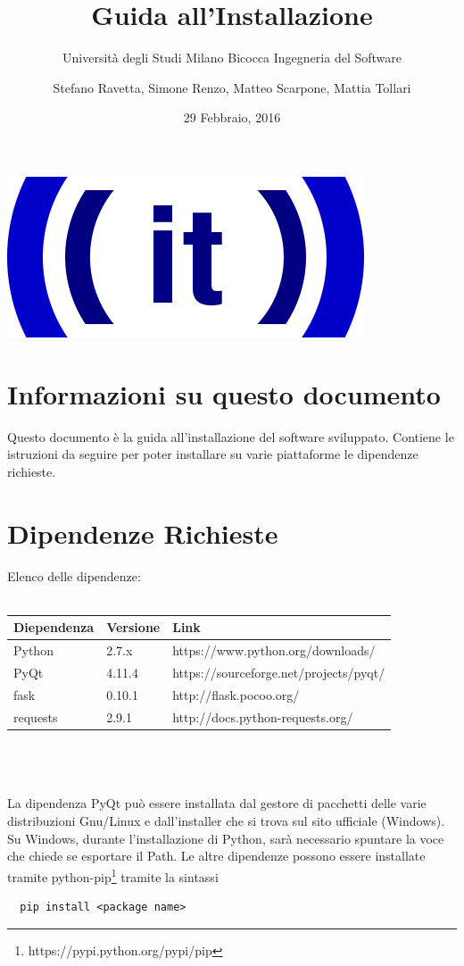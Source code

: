 \documentclass[12pt]{scrartcl}
\title{Guida all'Installazione}
\subtitle{Universit\`a degli Studi Milano Bicocca Ingegneria del Software}
\author{Stefano Ravetta, Simone Renzo, Matteo Scarpone, Mattia Tollari}
\date{29 Febbraio, 2016}
\begin{document}
\maketitle
\centerline{\includegraphics[scale=0.5]{ITicon.png}}
\tableofcontents
\section{Informazioni su questo documento}
    Questo documento \`e la guida all'installazione del software sviluppato.
    Contiene le istruzioni da seguire per poter installare su varie piattaforme
    le dipendenze richieste.

\section{Dipendenze Richieste}
  Elenco delle dipendenze:\\\\
  \begin{table}[h!]
  \label{tab:table1}
  \begin{tabular}{|l|l|l|}
      \toprule
      \textbf{Diependenza} & \textbf{Versione} &\textbf{Link}\\
      \midrule
      Python & 2.7.x & https://www.python.org/downloads/\\
      PyQt & 4.11.4 & https://sourceforge.net/projects/pyqt/\\
      fask & 0.10.1 & http://flask.pocoo.org/ \\
      requests & 2.9.1 & http://docs.python-requests.org/\\
      \midrule      
  \end{tabular}
  \end{table}
  \\\\\\La dipendenza PyQt pu\`o essere installata dal gestore di pacchetti delle varie distribuzioni
  Gnu/Linux e dall'installer che si trova sul sito ufficiale (Windows). Su  Windows, durante l'installazione di Python,
  sar\`a necessario spuntare la voce che chiede se esportare il Path.
  Le altre dipendenze possono essere installate tramite python-pip\footnote{https://pypi.python.org/pypi/pip}
  tramite la sintassi 
  \begin{verbatim}
  pip install <package name>
  \end{verbatim}
  
\end{document}
